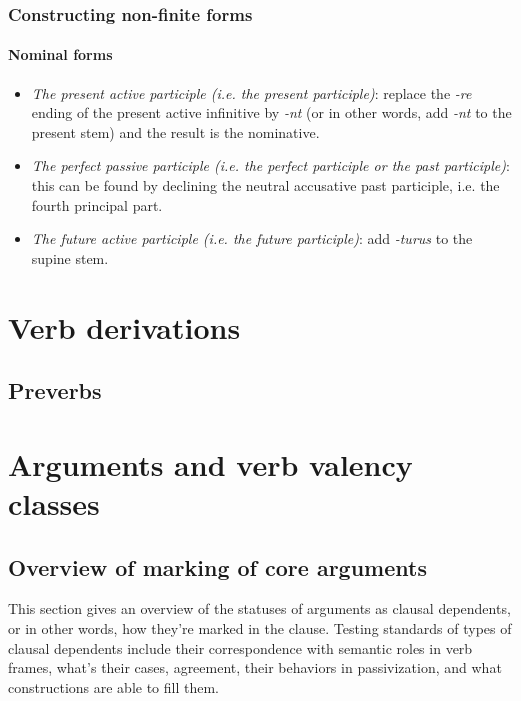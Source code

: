 \documentclass[a4paper, oneside]{report}
\newcommand{\corpus}[1]{\emph{#1}}
\begin{document}
\subsection{Constructing non-finite forms}

\subsubsection{Nominal forms}

\begin{itemize}
    \item \emph{The present active participle (i.e. the present participle)}: 
    replace the \corpus{-re} ending of the present active infinitive by \corpus{-nt}
    (or in other words, add \corpus{-nt} to the present stem)
    and the result is the nominative. %
    \item \emph{The perfect passive participle (i.e. the perfect participle or the past participle)}:
    this can be found by declining the neutral accusative past participle, 
    i.e. the fourth principal part.
    \item \emph{The future active participle (i.e. the future participle)}:
     add \corpus{-turus} to the supine stem.
\end{itemize}

\chapter{Verb derivations}

\section{Preverbs}

\chapter{Arguments and verb valency classes}

\section{Overview of marking of core arguments}\label{sec:core-argument-marking}

This section gives an overview of the statuses of arguments as clausal dependents,
or in other words, how they're marked in the clause.
Testing standards of types of clausal dependents include 
their correspondence with semantic roles in verb frames,
what's their cases, 
agreement, 
their behaviors in passivization, and
what constructions are able to fill them. 
\end{document}
